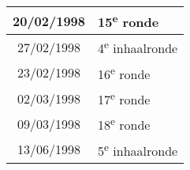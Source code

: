 \documentclass[a4paper]{scrreprt}
\begin{document}
\begin{landscape}
\begin{center}
\begin{tabular}{ c l }
    \hline
\rowcolor{headingkleur!25}
    20/02/1998 & 15\textsuperscript{e} ronde \\
    \hline
\rowcolor{headingkleur!10}
    27/02/1998 & 4\textsuperscript{e} inhaalronde \\
    \hline
\rowcolor{headingkleur!25}
    23/02/1998 & 16\textsuperscript{e} ronde \\
    \hline
\rowcolor{headingkleur!25}
    02/03/1998 & 17\textsuperscript{e} ronde \\
    \hline
\rowcolor{headingkleur!25}
    09/03/1998 & 18\textsuperscript{e} ronde \\
    \hline
\rowcolor{headingkleur!10}
    13/06/1998 & 5\textsuperscript{e} inhaalronde \\
    \hline
   \end{tabular}
  \end{center}
 \end{landscape}
\end{document}
